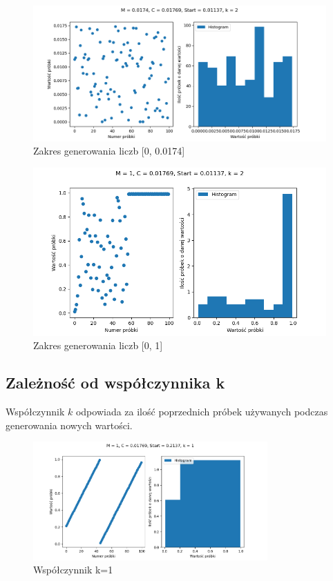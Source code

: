 \documentclass[12pt,a4paper]{article}
\begin{document}
\begin{figure}[H]
  \centering
  \includegraphics[width=1\textwidth]{figures/Figure_14.png}
  \caption{Zakres generowania liczb [0, 0.0174]}
  \label{fig:14}
\end{figure}

\begin{figure}[H]
  \centering
  \includegraphics[width=1\textwidth]{figures/Figure_15.png}
  \caption{Zakres generowania liczb [0, 1]}
  \label{fig:15}
\end{figure}


\subsection{Zależność od współczynnika k}
Współczynnik $k$ odpowiada za ilość poprzednich próbek używanych podczas generowania nowych wartości. 

\begin{figure}[H]
  \centering
  \includegraphics[width=0.8\textwidth]{figures/Figure_20.png}
  \caption{Współczynnik k=1}
  \label{fig:14}
\end{figure}
\end{document}
